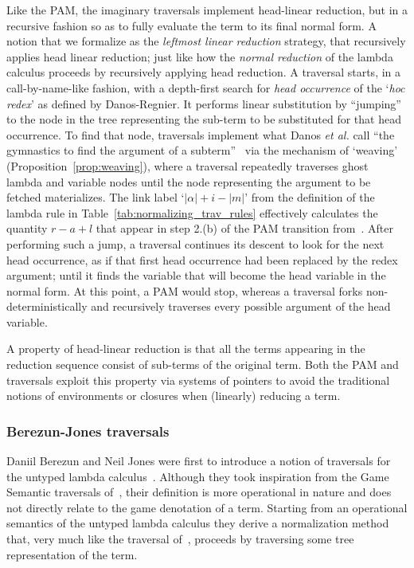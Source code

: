 \documentclass{elsarticle}
\makeatletter
\theoremstyle{plain}
\theoremstyle{definition}
\theoremstyle{remark}
\def\etal{\textit{et al.}\@\xspace}
\makeatother
\begin{document}
Like the PAM, the imaginary traversals implement head-linear reduction, but in a recursive fashion so as to fully evaluate the term to its final normal form.
A notion that we formalize as the \emph{leftmost linear reduction} strategy, that recursively applies head linear reduction; just like how the \emph{normal reduction} of the lambda calculus proceeds by recursively applying head reduction.
A traversal starts, in a call-by-name-like fashion, with a depth-first search for \emph{head occurrence} of the `\emph{hoc redex}' as defined by Danos-Regnier. It performs linear substitution by ``jumping'' to the node in the tree representing the sub-term to be substituted for that head occurrence.
To find that node, traversals implement what Danos \etal call ``the gymnastics to find the argument of a subterm''~\cite{danos-head} via the mechanism of `weaving' (Proposition~\ref{prop:weaving}),
where a traversal repeatedly traverses ghost lambda and variable nodes until the node representing the argument to be fetched materializes.
The link label `$|\alpha|+i-|m|$' from the definition
of the lambda rule in Table~\ref{tab:normalizing_trav_rules} effectively calculates the quantity $r-a+l$ that appear in step 2.(b) of the PAM transition from~\cite{danos-head}.
After performing such a jump, a traversal continues its descent to look for the next head occurrence, as if that first head occurrence had been replaced by the redex argument; until it finds the variable that will become the head variable in the normal form. At this point, a PAM would stop, whereas a traversal forks  non-deterministically and recursively traverses every possible argument of the head variable.

A property of head-linear reduction is that all the terms appearing in the reduction sequence consist of sub-terms of the original term.
Both the PAM and traversals exploit this property via systems of pointers to avoid the traditional notions of environments or closures when (linearly) reducing a term.

\subsubsection{Berezun-Jones traversals}

Daniil Berezun and Neil Jones were first to introduce a notion of traversals for the untyped lambda calculus~\cite{JonesBerezunLLL-PEPM17}.
Although they took inspiration from the Game Semantic traversals of~\cite{OngLics2006,BlumGalop2008}, their definition is more operational in nature and does not directly relate to the game denotation of a term. Starting from an operational semantics of the untyped lambda calculus they derive a normalization method that, very much like the traversal of~\cite{OngLics2006, BlumPhd}, proceeds by traversing some tree representation of the term.
\end{document}
